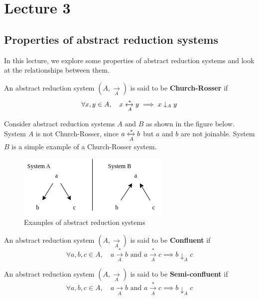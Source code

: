 
\section{Lecture 3}

\subsection{Properties of abstract reduction systems}

In this lecture, we explore some properties of abstract reduction systems and look at the relationships between them.

\begin{definition}
    An abstract reduction system $( A, \xrightarrow[A]{} )$ is said to be \textbf{Church-Rosser} if $$\forall x, y \in A, \quad x \xleftrightarrow[A]{*} y \implies x \downarrow_A y$$
\end{definition}

Consider abstract reduction systems $A$ and $B$ as shown in the figure below. System $A$ is not Church-Rosser, since $a \xleftrightarrow[A]{*} b$ but $a$ and $b$ are not joinable. System $B$ is a simple example of a Church-Rosser system.

\begin{figure}[htbp]
    \center
    \includegraphics[scale=0.8]{images/lecture1/CR.png}
    \caption{Examples of abstract reduction systems}
\end{figure}


\begin{definition}
    An abstract reduction system $( A, \xrightarrow[A]{} )$ is said to be \textbf{Confluent} if $$\forall a, b, c \in A, \quad a \xrightarrow[A]{*} b \text{ and }  a \xrightarrow[A]{*} c \implies b \downarrow_A c$$
\end{definition}

\begin{definition}
    An abstract reduction system $( A, \xrightarrow[A]{} )$ is said to be \textbf{Semi-confluent} if $$\forall a, b, c \in A, \quad a \xrightarrow[A]{} b \text{ and }  a \xrightarrow[A]{*} c \implies b \downarrow_A c$$
\end{definition}

